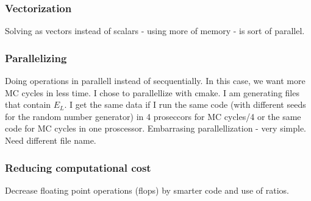 \subsubsection{Vectorization}

Solving as vectors instead of scalars - using more of memory - is sort of parallel. 

\subsubsection{Parallelizing}

Doing operations in parallell instead of secquentially. In this case, we want more MC cycles in less time. I chose to parallellize with cmake. I am generating files that contain $E_L$. I get the same data if I run the same code (with different seeds for the random number generator) in 4 proseccors for MC cycles/4 or the same code for MC cycles in one proscessor. Embarrasing parallellization - very simple. Need different file name. 

\subsubsection{Reducing computational cost}

Decrease floating point operations (flops) by smarter code and use of ratios.